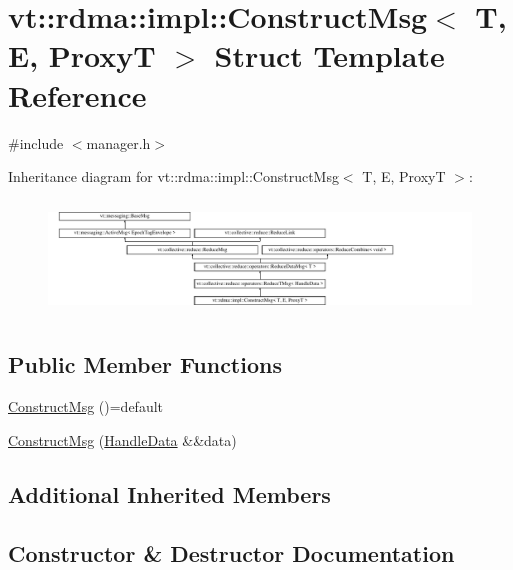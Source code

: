 \hypertarget{structvt_1_1rdma_1_1impl_1_1_construct_msg}{}\section{vt\+:\+:rdma\+:\+:impl\+:\+:Construct\+Msg$<$ T, E, ProxyT $>$ Struct Template Reference}
\label{structvt_1_1rdma_1_1impl_1_1_construct_msg}


{\ttfamily \#include $<$manager.\+h$>$}

Inheritance diagram for vt\+:\+:rdma\+:\+:impl\+:\+:Construct\+Msg$<$ T, E, ProxyT $>$\+:\begin{figure}[H]
\begin{center}
\leavevmode
\includegraphics[height=3.060109cm]{structvt_1_1rdma_1_1impl_1_1_construct_msg}
\end{center}
\end{figure}
\subsection*{Public Member Functions}
\begin{DoxyCompactItemize}
\item 
\hyperlink{structvt_1_1rdma_1_1impl_1_1_construct_msg_a3189d5abbc7385a586cab39d291370a6}{Construct\+Msg} ()=default
\item 
\hyperlink{structvt_1_1rdma_1_1impl_1_1_construct_msg_ad09c61f7e1cb33be9631a2e4885f9cfa}{Construct\+Msg} (\hyperlink{structvt_1_1rdma_1_1impl_1_1_handle_data}{Handle\+Data} \&\&data)
\end{DoxyCompactItemize}
\subsection*{Additional Inherited Members}


\subsection{Constructor \& Destructor Documentation}
\mbox{\label{structvt_1_1rdma_1_1impl_1_1_construct_msg_a3189d5abbc7385a586cab39d291370a6}} 
